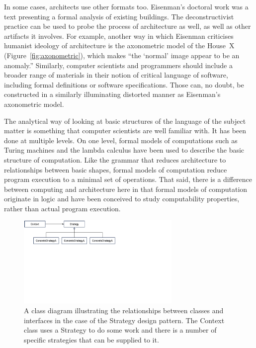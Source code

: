 In some cases, architects use other formats too. Eisenman's doctoral work was a text presenting
a formal analysis of existing buildings. The deconstructivist practice can be used to probe the
process of architecture as well, as well as other artifacts it involves. For example,
another way in which Eisenman criticises humanist ideology of architecture is the
axonometric model of the House~X (Figure~\ref{fig:axonometric}), which makes
``the `normal' image appear to be an anomaly.''
Similarly, computer scientists and programmers should include a broader range of materials in
their notion of critical language of software, including formal definitions or software
specifications. Those can, no doubt, be constructed in a similarly illuminating distorted
manner as Eisenman's axonometric model.

The analytical way of looking at basic structures of the language of the subject matter is something
that computer scientists are well familiar with. It has been done at multiple levels. On one
level, formal models of computations such as Turing machines and the lambda calculus have been
used to describe the basic structure of computation. Like the grammar that reduces architecture
to relationships between basic shapes, formal models of computation reduce program execution to
a minimal set of operations. That said, there is a difference between computing and architecture
here in that formal models of computation originate in logic and have been conceived to study
computability properties, rather than actual program execution.

\begin{figure}
\centering
\includegraphics[width=0.7\textwidth,trim=0cm 13.5cm 12.5cm 0cm,clip]{chapters/fig/strategy.pdf}
\caption{A class diagram illustrating the relationships between classes and interfaces in the
case of the Strategy design pattern. The Context class uses a Strategy to do some work and
there is a number of specific strategies that can be supplied to it.}
\label{fig:strategy}
\end{figure}

